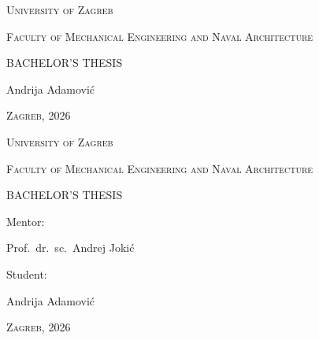 \documentclass[12pt,a4paper]{report}
\newcommand{\university}{University of Zagreb}
\newcommand{\faculty}{Faculty of Mechanical Engineering and Naval Architecture}
\newcommand{\thesistype}{Bachelor's Thesis}
\newcommand{\authorname}{Andrija Adamovi\'{c}}
\newcommand{\mentorone}{Prof.\ dr.\ sc.\ Andrej Joki\'{c}}
\newcommand{\mentortwo}{}
\newcommand{\placeyear}{Zagreb, 2026}
\begin{document}
\begin{titlepage}
    \centering
    \thispagestyle{empty}

    {\large\scshape \university\par}
    \vspace{3mm}
    {\large\scshape \faculty\par}

    \vspace*{80mm}
    {\Huge\scshape \MakeUppercase{\thesistype}\par}

    \vspace{38mm}
    \begin{flushright}
        {\Large \authorname\par}
    \end{flushright}

    \vfill
    {\large\scshape \placeyear\par}
\end{titlepage}

\begin{titlepage}
    \centering
    \thispagestyle{empty}

    {\Large\scshape \university\par}
    \vspace{3mm}
    {\Large\scshape \faculty\par}

    \vspace*{80mm}
    {\Huge\scshape \MakeUppercase{\thesistype}\par}

    \vspace{38mm}
    \noindent
    \begin{minipage}[t]{0.52\textwidth}
        \raggedright{}
        {\Large Mentor:\par}
        \vspace{9mm}
        {\Large \mentorone\par}
        \ifx\mentortwo\empty\else
            \vspace{3mm}
            {\Large \mentortwo\par}
        \fi
    \end{minipage}
    \hfill
    \begin{minipage}[t]{0.34\textwidth}
        \raggedleft{}
        {\Large Student:\par}
        \vspace{9mm}
        {\Large \authorname\par}
    \end{minipage}

    \vfill
    {\large\scshape \placeyear\par}
\end{titlepage}
\end{document}
